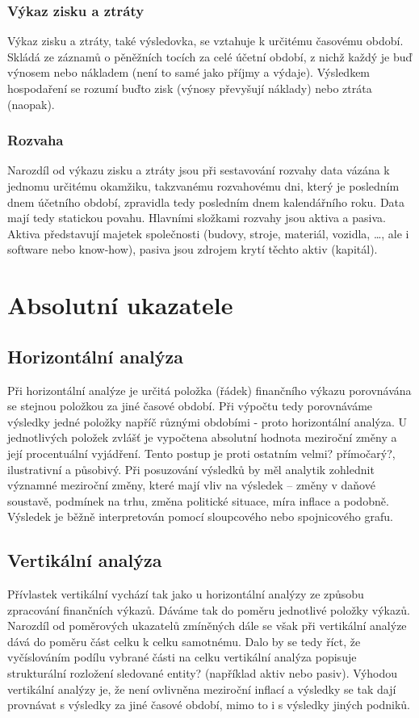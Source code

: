 \subsubsection{Výkaz zisku a ztráty}
Výkaz zisku a ztráty, také výsledovka, se vztahuje k určitému časovému období. Skládá ze záznamů o pěněžních tocích za celé účetní období, z nichž každý je buď výnosem nebo nákladem (není to samé jako příjmy a výdaje). Výsledkem hospodaření se rozumí buďto zisk (výnosy převyšují náklady) nebo ztráta (naopak).

\subsubsection{Rozvaha}
Narozdíl od výkazu zisku a ztráty jsou při sestavování rozvahy data vázána k jednomu určitému okamžiku, takzvanému rozvahovému dni, který je posledním dnem účetního období, zpravidla tedy posledním dnem kalendářního roku. Data mají tedy statickou povahu.
Hlavními složkami rozvahy jsou aktiva a pasiva. Aktiva představují majetek společnosti (budovy, stroje, materiál, vozidla, \dots, ale i software nebo know-how), pasiva jsou zdrojem krytí těchto aktiv (kapitál).

\section{Absolutní ukazatele}

\subsection{Horizontální analýza}
Při horizontální analýze je určitá položka (řádek) finančního výkazu porovnávána se stejnou položkou za jiné časové období. Při výpočtu tedy porovnáváme výsledky jedné položky napříč různými obdobími - proto horizontální analýza. U jednotlivých položek zvlášť je vypočtena absolutní hodnota meziroční změny a její procentuální vyjádření. Tento postup je proti ostatním velmi? přímočarý?, ilustrativní a působivý. Při posuzování výsledků by měl analytik zohlednit významné meziroční změny, které mají vliv na výsledek -- změny v daňové soustavě, podmínek na trhu, změna politické situace, míra inflace a podobně. Výsledek je běžně interpretován pomocí sloupcového nebo spojnicového grafu. 


\subsection{Vertikální analýza}
Přívlastek vertikální vychází tak jako u horizontální analýzy ze způsobu zpracování finančních výkazů. Dáváme tak do poměru jednotlivé položky výkazů. Narozdíl od poměrových ukazatelů zmíněných dále se však při vertikální analýze dává do poměru část celku k celku samotnému. Dalo by se tedy říct, že vyčíslováním podílu vybrané části na celku vertikální analýza popisuje strukturální rozložení sledované entity? (například aktiv nebo pasiv). 
Výhodou vertikální analýzy je, že není ovlivněna meziroční inflací a výsledky se tak dají provnávat s výsledky za jiné časové období, mimo to i s výsledky jiných podniků\cite{sedl}.
